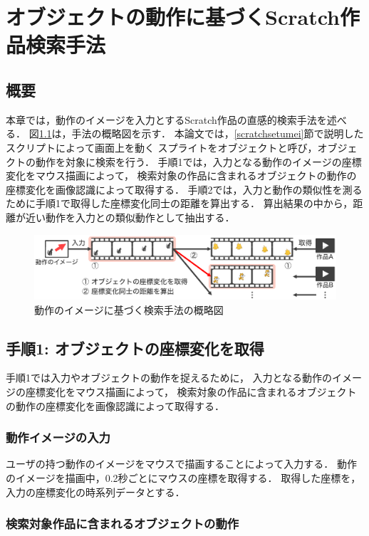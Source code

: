 \documentclass[11pt]{jreport}
\begin{document}
\chapter{オブジェクトの動作に基づくScratch作品検索手法}

\section{概要}
本章では，動作のイメージを入力とするScratch作品の直感的検索手法を述べる．
図\ref{flow}は，手法の概略図を示す．
本論文では，\ref{scratchsetumei}節で説明したスクリプトによって画面上を動く
スプライトをオブジェクトと呼び，オブジェクトの動作を対象に検索を行う．
手順1では，入力となる動作のイメージの座標変化をマウス描画によって，
検索対象の作品に含まれるオブジェクトの動作の座標変化を画像認識によって取得する．
手順2では，入力と動作の類似性を測るために手順1で取得した座標変化同士の距離を算出する．
算出結果の中から，距離が近い動作を入力との類似動作として抽出する．

\begin{figure}[H]
    \centering
    \includegraphics[width=15cm]{flow.eps}
    \caption{動作のイメージに基づく検索手法の概略図}
    \label{flow}
\end{figure}


\section{手順1: オブジェクトの座標変化を取得}
手順1では入力やオブジェクトの動作を捉えるために，
入力となる動作のイメージの座標変化をマウス描画によって，
検索対象の作品に含まれるオブジェクトの動作の座標変化を画像認識によって取得する．

\subsection{動作イメージの入力}
ユーザの持つ動作のイメージをマウスで描画することによって入力する．
動作のイメージを描画中，0.2秒ごとにマウスの座標を取得する．
取得した座標を，入力の座標変化の時系列データとする．

\subsection{検索対象作品に含まれるオブジェクトの動作}
\label{objectbehavior}
\end{document}
